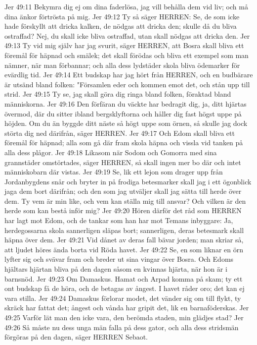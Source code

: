Jer 49:11  Bekymra dig ej om dina faderlösa, jag vill behålla dem vid liv; och må dina änkor förtrösta på mig.
Jer 49:12  Ty så säger HERREN: Se, de som icke hade förskyllt att dricka kalken, de nödgas att dricka den; skulle då du bliva ostraffad? Nej, du skall icke bliva ostraffad, utan skall nödgas att dricka den.
Jer 49:13  Ty vid mig själv har jag svurit, säger HERREN, att Bosra skall bliva ett föremål för häpnad och smälek; det skall förödas och bliva ett exempel som man nämner, när man förbannar; och alla dess lydstäder skola bliva ödemarker för evärdlig tid.
Jer 49:14  Ett budskap har jag hört från HERREN, och en budbärare är utsänd bland folken: "Församlen eder och kommen emot det, och stån upp till strid.
Jer 49:15  Ty se, jag skall göra dig ringa bland folken, föraktad bland människorna.
Jer 49:16  Den förfäran du väckte har bedragit dig, ja, ditt hjärtas övermod, där du sitter ibland bergsklyftorna och håller dig fast högst uppe på höjden. Om du än byggde ditt näste så högt uppe som örnen, så skulle jag dock störta dig ned därifrån, säger HERREN.
Jer 49:17  Och Edom skall bliva ett föremål för häpnad; alla som gå där fram skola häpna och vissla vid tanken på alla dess plågor.
Jer 49:18  Likasom när Sodom och Gomorra med sina grannstäder omstörtades, säger HERREN, så skall ingen mer bo där och intet människobarn där vistas.
Jer 49:19  Se, lik ett lejon som drager upp från Jordanbygdens snår och bryter in på frodiga betesmarker skall jag i ett ögonblick jaga dem bort därifrån; och den som jag utväljer skall jag sätta till herde över dem. Ty vem är min like, och vem kan ställa mig till ansvar? Och vilken är den herde som kan bestå inför mig?
Jer 49:20  Hören därför det råd som HERREN har lagt mot Edom, och de tankar som han har mot Temans inbyggare: Ja, herdegossarna skola sannerligen släpas bort; sannerligen, deras betesmark skall häpna över dem.
Jer 49:21  Vid dånet av deras fall bävar jorden; man skriar så, att ljudet höres ända borta vid Röda havet.
Jer 49:22  Se, en som liknar en örn lyfter sig och svävar fram och breder ut sina vingar över Bosra. Och Edoms hjältars hjärtan bliva på den dagen såsom en kvinnas hjärta, när hon är i barnsnöd.
Jer 49:23  Om Damaskus. Hamat och Arpad komma på skam; ty ett ont budskap få de höra, och de betagas av ångest. I havet råder oro; det kan ej vara stilla.
Jer 49:24  Damaskus förlorar modet, det vänder sig om till flykt, ty skräck har fattat det; ångest och vånda har gripit det, lik en barnaföderskas.
Jer 49:25  Varför lät man den icke vara, den berömda staden, min glädjes stad?
Jer 49:26  Så måste nu dess unga män falla på dess gator, och alla dess stridsmän förgöras på den dagen, säger HERREN Sebaot.

